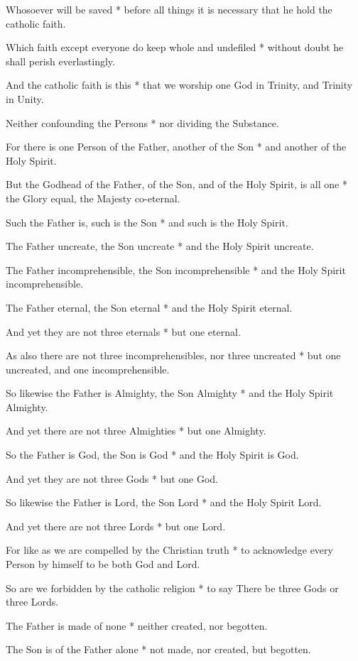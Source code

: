 Whosoever will be saved * before all things it is necessary that he hold the catholic faith.

Which faith except everyone do keep whole and undefiled * without doubt he shall perish everlastingly.

And the catholic faith is this * that we worship one God in Trinity, and Trinity in Unity.

Neither confounding the Persons * nor dividing the Substance.

For there is one Person of the Father, another of the Son * and another of the Holy Spirit.

But the Godhead of the Father, of the Son, and of the Holy Spirit, is all one * the Glory equal, the Majesty co-eternal.

Such the Father is, such is the Son * and such is the Holy Spirit.

The Father uncreate, the Son uncreate * and the Holy Spirit uncreate.

The Father incomprehensible, the Son incomprehensible * and the Holy Spirit incomprehensible.

The Father eternal, the Son eternal * and the Holy Spirit eternal.

And yet they are not three eternals * but one eternal.

As also there are not three incomprehensibles, nor three uncreated * but one uncreated, and one incomprehensible.

So likewise the Father is Almighty, the Son Almighty * and the Holy Spirit Almighty.

And yet there are not three Almighties * but one Almighty.

So the Father is God, the Son is God * and the Holy Spirit is God.

And yet they are not three Gods * but one God.

So likewise the Father is Lord, the Son Lord * and the Holy Spirit Lord.

And yet there are not three Lords * but one Lord.

For like as we are compelled by the Christian truth * to acknowledge every Person by himself to be both God and Lord.

So are we forbidden by the catholic religion * to say There be three Gods or three Lords. 

The Father is made of none * neither created, nor begotten.

The Son is of the Father alone * not made, nor created, but begotten.

